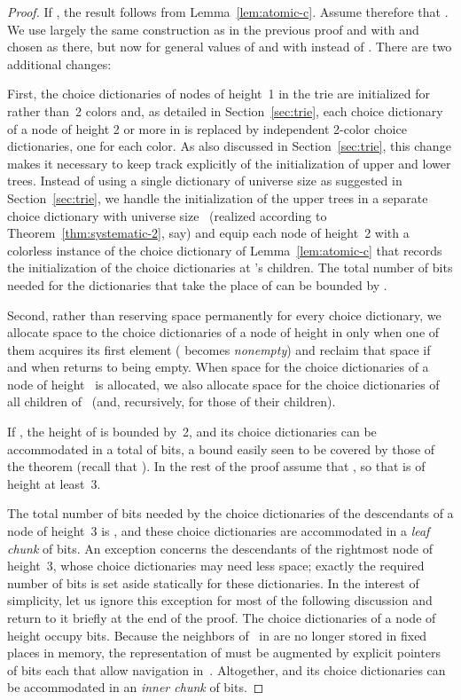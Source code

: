 \documentclass[envcountsame,envcountsect,undated,nolinenumbers]{lnthi}
\begin{document}
\begin{proof}
If , the result follows
from Lemma~\ref{lem:atomic-c}.
Assume therefore that .
We use largely the same construction as in the previous proof
and with  and  chosen as there, but 
now for general values of  and with 
instead of .
There are two additional changes:

First, the choice
dictionaries of nodes of height~1
in the trie  are initialized for  rather
than~2 colors and, as detailed in
Section~\ref{sec:trie}, each choice dictionary
of a node of height 2 or more in 
is replaced by  independent 2-color
choice dictionaries, one for each color.
As also discussed in Section~\ref{sec:trie},
this change makes it necessary to keep track
explicitly of the initialization of
upper and lower trees.
Instead of using a single dictionary 
of universe size  as
suggested in Section~\ref{sec:trie},
we handle the initialization of the
 upper trees in a separate choice
dictionary with universe size~
(realized according to Theorem~\ref{thm:systematic-2}, say)
and equip each node  of height~2 with
a colorless instance of the choice dictionary 
of Lemma~\ref{lem:atomic-c}
that records the initialization
of the choice dictionaries at 's children.
The total number of bits needed for the
dictionaries that take the place of 
can be bounded by
.

Second, rather than reserving space
permanently for every choice dictionary,
we allocate space to the  choice dictionaries
of a node  of height  in 
only when one of them acquires its first element
( becomes \emph{nonempty}) and reclaim that
space if and when  returns to being empty.
When space for the choice dictionaries of a node  of
height~ is allocated, we also allocate space for the
choice dictionaries of all children of~
(and, recursively, for those of their children).

If , the height of  is bounded by~2,
and its choice dictionaries can be accommodated
in a total of 
 bits,
a bound easily seen to be covered
by those of the theorem (recall that ).
In the rest of the proof assume that ,
so that  is of height at least~3.
 
The total number of bits needed by the choice dictionaries
of the descendants of a node of height~3
is ,
and these choice dictionaries are accommodated in
a \emph{leaf chunk} of  bits.
An exception concerns the descendants of
the rightmost node of height~3,
whose choice dictionaries may need less space;
exactly the required number of bits
is set aside statically for these dictionaries.
In the interest of simplicity, let us ignore
this exception for most of the following
discussion and return to it briefly at the end of the proof.
The  choice dictionaries of a node  of height 
occupy  bits.
Because the neighbors of~ in  are no longer
stored in fixed places in memory, the representation
of  must be augmented by  explicit pointers
of  bits each that allow
navigation in~.
Altogether,  and its choice dictionaries can be
accommodated in an \emph{inner chunk} of
 bits.


\end{proof}
\end{document}
